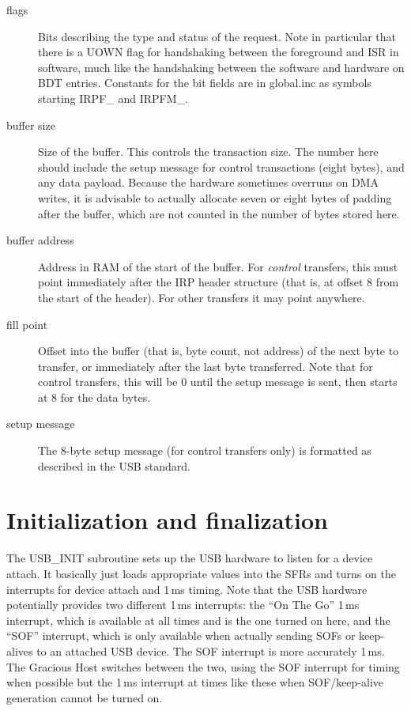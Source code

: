\begin{description}
  \item[flags]  Bits describing the type and status of the request. 
    Note in particular that there is a UOWN flag for handshaking between the
    foreground and ISR in software, much like the handshaking between the
    software and hardware on BDT entries.  Constants for the bit fields are
    in global.inc as symbols starting IRPF\_ and IRPFM\_.

  \item[buffer size]  Size of the buffer.  This controls the transaction
    size.  The number here should include the setup message
    for control transactions (eight bytes), and any data payload.  Because
    the hardware sometimes overruns on DMA writes, it is advisable
    to actually allocate seven or eight bytes of padding after the
    buffer, which are not counted in the number of bytes stored here.

  \item[buffer address]  Address in RAM of the start of the buffer.  For
    \emph{control} transfers, this must point immediately after the IRP
    header structure (that is, at offset 8 from the start of the header). 
    For other transfers it may point anywhere.

  \item[fill point]  Offset into the buffer (that is, byte count, not
    address) of the next byte to transfer, or immediately after the last byte
    transferred.  Note that for control transfers, this will be 0 until the
    setup message is sent, then starts at 8 for the data bytes.

  \item[setup message]  The 8-byte setup message (for control transfers
    only) is formatted as described in the USB standard.
\end{description}

\section{Initialization and finalization}

The USB\_INIT subroutine sets up the USB hardware to listen for a device
attach.  It basically just loads appropriate values into the SFRs and turns
on the interrupts for device attach and 1\,ms timing.  Note that the USB
hardware potentially provides two different 1\,ms interrupts:  the ``On The
Go'' 1\,ms interrupt, which is available at all times and is the one turned
on here, and the ``SOF'' interrupt, which is only available when actually
sending SOFs or keep-alives to an attached USB device.  The SOF interrupt is
more accurately 1\,ms.  The Gracious Host switches between the two, using
the SOF interrupt for timing when possible but the 1\,ms interrupt at times
like these when SOF/keep-alive generation cannot be turned on.

